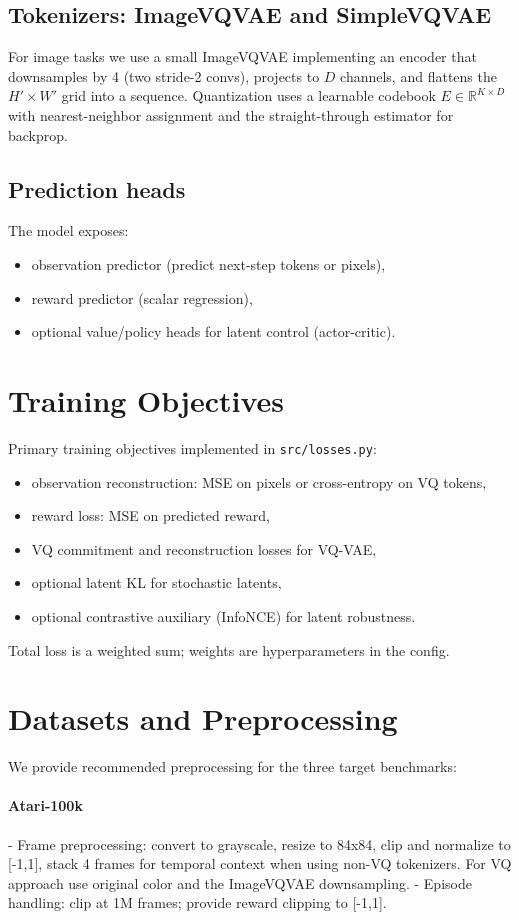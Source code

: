 \documentclass{article}
\begin{document}
\subsection{Tokenizers: ImageVQVAE and SimpleVQVAE}
For image tasks we use a small ImageVQVAE implementing an encoder that downsamples by 4 (two stride-2 convs), projects to $D$ channels, and flattens the $H'\times W'$ grid into a sequence. Quantization uses a learnable codebook $E\in\mathbb{R}^{K\times D}$ with nearest-neighbor assignment and the straight-through estimator for backprop.

\subsection{Prediction heads}
The model exposes:
\begin{itemize}
  \item observation predictor (predict next-step tokens or pixels),
  \item reward predictor (scalar regression),
  \item optional value/policy heads for latent control (actor-critic).
\end{itemize}

\section{Training Objectives}
Primary training objectives implemented in \texttt{src/losses.py}:
\begin{itemize}
  \item observation reconstruction: MSE on pixels or cross-entropy on VQ tokens,
  \item reward loss: MSE on predicted reward,
  \item VQ commitment and reconstruction losses for VQ-VAE,
  \item optional latent KL for stochastic latents,
  \item optional contrastive auxiliary (InfoNCE) for latent robustness.
\end{itemize}
Total loss is a weighted sum; weights are hyperparameters in the config.

\section{Datasets and Preprocessing}
We provide recommended preprocessing for the three target benchmarks:
\paragraph{Atari-100k}
- Frame preprocessing: convert to grayscale, resize to 84x84, clip and normalize to [-1,1], stack 4 frames for temporal context when using non-VQ tokenizers. For VQ approach use original color and the ImageVQVAE downsampling.
- Episode handling: clip at 1M frames; provide reward clipping to [-1,1].
\end{document}
